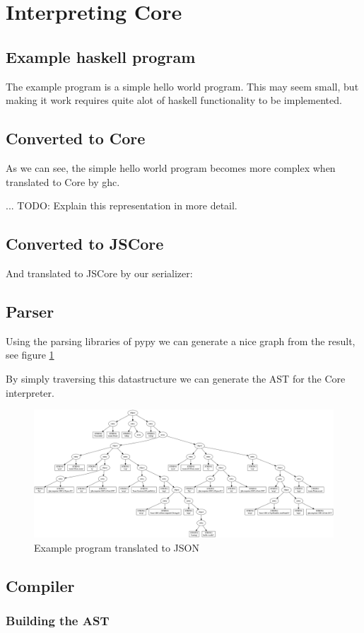 
\section{Interpreting Core}

\subsection{Example haskell program}

The example program is a simple hello world program. This may seem small, but making it
work requires quite alot of haskell functionality to be implemented.



\subsection{Converted to Core}

As we can see, the simple hello world program becomes more complex when translated
to Core by ghc.



... TODO: Explain this representation in more detail.

\subsection{Converted to JSCore}

And translated to JSCore by our serializer:



\subsection{Parser}

Using the parsing libraries of pypy we can generate a nice graph from the result, 
see figure \ref{fig:helloworldgraph}

By simply traversing this datastructure we can generate the AST for the Core interpreter.

\begin{figure}

\includegraphics[width=\textwidth]{diags/helloworld2.png}
\caption{Example program translated to JSON}
\label{fig:helloworldgraph}

\end{figure}

\subsection{Compiler}

\subsubsection{Building the AST}


